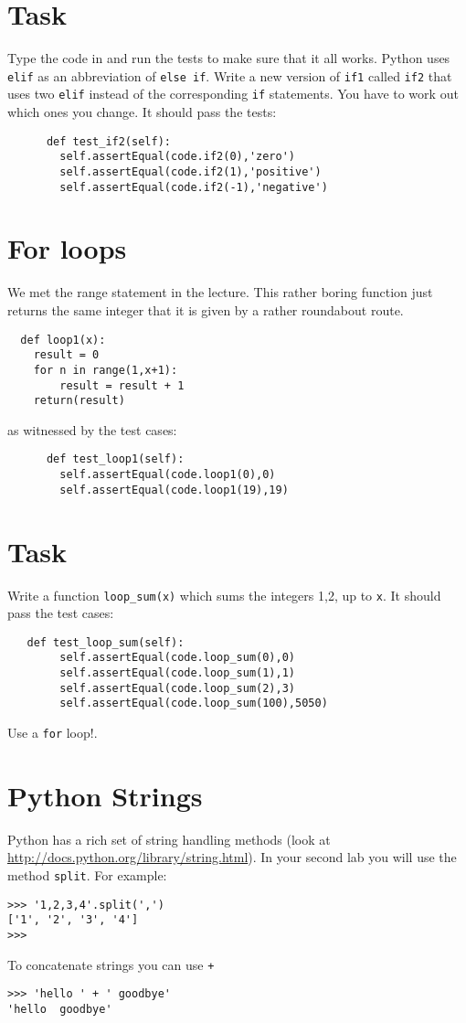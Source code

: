 \documentclass{paper}
\begin{document}
\section{Task}
Type the code in and run the tests to make sure that it all
works. Python uses {\tt elif} as an abbreviation of {\tt else
  if}. Write a new version of {\tt if1} called {\tt if2} that uses
two {\tt elif} instead of the corresponding {\tt if} statements. You
have to work out which ones you change. It should pass the tests:
\begin{lstlisting}
      def test_if2(self):
        self.assertEqual(code.if2(0),'zero')
        self.assertEqual(code.if2(1),'positive')
        self.assertEqual(code.if2(-1),'negative')
\end{lstlisting}

\section*{For loops}
We met the range statement in the lecture. This rather boring function
just returns the same integer that it is given by a rather roundabout
route.
\begin{lstlisting}
  def loop1(x):
    result = 0
    for n in range(1,x+1):
        result = result + 1
    return(result)
\end{lstlisting}
as witnessed by the test cases:
\begin{lstlisting}
      def test_loop1(self):
        self.assertEqual(code.loop1(0),0)
        self.assertEqual(code.loop1(19),19)
\end{lstlisting}

\section{Task}
Write a function {\tt loop\_sum(x)} which sums the integers 1,2, up to
{\tt x}. It should pass the test cases:
\begin{lstlisting}
   def test_loop_sum(self):
        self.assertEqual(code.loop_sum(0),0)
        self.assertEqual(code.loop_sum(1),1)
        self.assertEqual(code.loop_sum(2),3)
        self.assertEqual(code.loop_sum(100),5050)
\end{lstlisting}
Use a {\tt for} loop!.

\section*{Python Strings}

Python has a rich set of string handling methods (look at \url{http://docs.python.org/library/string.html}). In your second lab
you will use the  method {\tt split}. For example:
\begin{verbatim}
>>> '1,2,3,4'.split(',')
['1', '2', '3', '4']
>>>
\end{verbatim}
To concatenate strings you can use {\tt +}
\begin{verbatim}
>>> 'hello ' + ' goodbye'
'hello  goodbye'
\end{verbatim}
\end{document}
